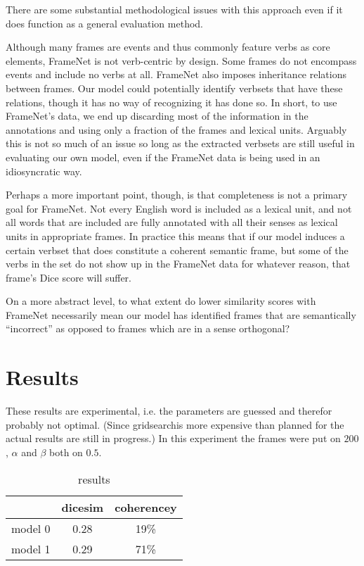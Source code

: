 \documentclass{article} %
\begin{document}
There are some substantial methodological issues with this approach even if it does function as a general evaluation method. 

Although many frames are events and thus commonly feature verbs as core elements, FrameNet is not verb-centric by design. Some frames do not encompass events and include no verbs at all.
FrameNet also imposes inheritance relations between frames. Our model could potentially identify verbsets that have these relations, though it has no way of recognizing it has done so.
In short, to use FrameNet's data, we end up discarding most of the information in the annotations and using only a fraction of the frames and lexical units. Arguably this is not so much of an issue so long as the extracted verbsets are still useful in evaluating our own model, even if the FrameNet data is being used in an idiosyncratic way.

Perhaps a more important point, though, is that completeness is not a primary goal for FrameNet. Not every English word is included as a lexical unit, and not all words that are included are fully annotated with all their senses as lexical units in appropriate frames.
In practice this means that if our model induces a certain verbset that does constitute a coherent semantic frame, but some of the verbs in the set do not show up in the FrameNet data for whatever reason, that frame's Dice score will suffer.
% 




On a more abstract level, to what extent do lower similarity scores with FrameNet necessarily mean our model has identified frames that are semantically ``incorrect'' as opposed to frames which are in a sense orthogonal?





\section{Results}
These results are experimental, i.e. the parameters are guessed and therefor probably not optimal. (Since gridsearchis more expensive than planned for the actual results are still in progress.) In this experiment the frames were put on $200$, $\alpha$ and $\beta$ both on $0.5$.\\
\begin{table}[h]
\begin{tabular}{|l||c|c|}
  \hline
  &dicesim&coherencey\\
  \hline
  \hline
  model 0& 0.28&19\%  \\
  \hline
  model 1&0.29 &71\%  \\
  \hline
\end{tabular}
\caption{results}
\label{results}
\end{table}
\end{document}
